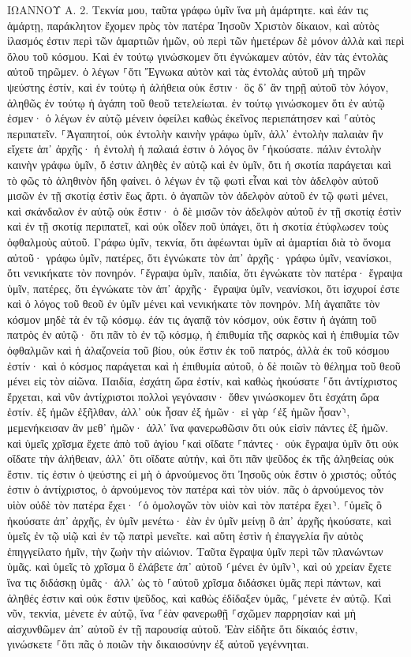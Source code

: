 \documentclass[twoside, 9pt]{extreport}
\begin{document}
ΙΩΑΝΝΟΥ Α.
2.
Τεκνία μου, ταῦτα γράφω ὑμῖν ἵνα μὴ ἁμάρτητε. καὶ ἐάν τις ἁμάρτῃ, παράκλητον ἔχομεν πρὸς τὸν πατέρα Ἰησοῦν Χριστὸν δίκαιον, 
καὶ αὐτὸς ἱλασμός ἐστιν περὶ τῶν ἁμαρτιῶν ἡμῶν, οὐ περὶ τῶν ἡμετέρων δὲ μόνον ἀλλὰ καὶ περὶ ὅλου τοῦ κόσμου. 
Καὶ ἐν τούτῳ γινώσκομεν ὅτι ἐγνώκαμεν αὐτόν, ἐὰν τὰς ἐντολὰς αὐτοῦ τηρῶμεν. 
ὁ λέγων ⸀ὅτι Ἔγνωκα αὐτὸν καὶ τὰς ἐντολὰς αὐτοῦ μὴ τηρῶν ψεύστης ἐστίν, καὶ ἐν τούτῳ ἡ ἀλήθεια οὐκ ἔστιν· 
ὃς δ᾽ ἂν τηρῇ αὐτοῦ τὸν λόγον, ἀληθῶς ἐν τούτῳ ἡ ἀγάπη τοῦ θεοῦ τετελείωται. ἐν τούτῳ γινώσκομεν ὅτι ἐν αὐτῷ ἐσμεν· 
ὁ λέγων ἐν αὐτῷ μένειν ὀφείλει καθὼς ἐκεῖνος περιεπάτησεν καὶ ⸀αὐτὸς περιπατεῖν. 
⸀Ἀγαπητοί, οὐκ ἐντολὴν καινὴν γράφω ὑμῖν, ἀλλ᾽ ἐντολὴν παλαιὰν ἣν εἴχετε ἀπ᾽ ἀρχῆς· ἡ ἐντολὴ ἡ παλαιά ἐστιν ὁ λόγος ὃν ⸀ἠκούσατε. 
πάλιν ἐντολὴν καινὴν γράφω ὑμῖν, ὅ ἐστιν ἀληθὲς ἐν αὐτῷ καὶ ἐν ὑμῖν, ὅτι ἡ σκοτία παράγεται καὶ τὸ φῶς τὸ ἀληθινὸν ἤδη φαίνει. 
ὁ λέγων ἐν τῷ φωτὶ εἶναι καὶ τὸν ἀδελφὸν αὐτοῦ μισῶν ἐν τῇ σκοτίᾳ ἐστὶν ἕως ἄρτι. 
ὁ ἀγαπῶν τὸν ἀδελφὸν αὐτοῦ ἐν τῷ φωτὶ μένει, καὶ σκάνδαλον ἐν αὐτῷ οὐκ ἔστιν· 
ὁ δὲ μισῶν τὸν ἀδελφὸν αὐτοῦ ἐν τῇ σκοτίᾳ ἐστὶν καὶ ἐν τῇ σκοτίᾳ περιπατεῖ, καὶ οὐκ οἶδεν ποῦ ὑπάγει, ὅτι ἡ σκοτία ἐτύφλωσεν τοὺς ὀφθαλμοὺς αὐτοῦ. 
Γράφω ὑμῖν, τεκνία, ὅτι ἀφέωνται ὑμῖν αἱ ἁμαρτίαι διὰ τὸ ὄνομα αὐτοῦ· 
γράφω ὑμῖν, πατέρες, ὅτι ἐγνώκατε τὸν ἀπ᾽ ἀρχῆς· γράφω ὑμῖν, νεανίσκοι, ὅτι νενικήκατε τὸν πονηρόν. 
⸀ἔγραψα ὑμῖν, παιδία, ὅτι ἐγνώκατε τὸν πατέρα· ἔγραψα ὑμῖν, πατέρες, ὅτι ἐγνώκατε τὸν ἀπ᾽ ἀρχῆς· ἔγραψα ὑμῖν, νεανίσκοι, ὅτι ἰσχυροί ἐστε καὶ ὁ λόγος τοῦ θεοῦ ἐν ὑμῖν μένει καὶ νενικήκατε τὸν πονηρόν. 
Μὴ ἀγαπᾶτε τὸν κόσμον μηδὲ τὰ ἐν τῷ κόσμῳ. ἐάν τις ἀγαπᾷ τὸν κόσμον, οὐκ ἔστιν ἡ ἀγάπη τοῦ πατρὸς ἐν αὐτῷ· 
ὅτι πᾶν τὸ ἐν τῷ κόσμῳ, ἡ ἐπιθυμία τῆς σαρκὸς καὶ ἡ ἐπιθυμία τῶν ὀφθαλμῶν καὶ ἡ ἀλαζονεία τοῦ βίου, οὐκ ἔστιν ἐκ τοῦ πατρός, ἀλλὰ ἐκ τοῦ κόσμου ἐστίν· 
καὶ ὁ κόσμος παράγεται καὶ ἡ ἐπιθυμία αὐτοῦ, ὁ δὲ ποιῶν τὸ θέλημα τοῦ θεοῦ μένει εἰς τὸν αἰῶνα. 
Παιδία, ἐσχάτη ὥρα ἐστίν, καὶ καθὼς ἠκούσατε ⸀ὅτι ἀντίχριστος ἔρχεται, καὶ νῦν ἀντίχριστοι πολλοὶ γεγόνασιν· ὅθεν γινώσκομεν ὅτι ἐσχάτη ὥρα ἐστίν. 
ἐξ ἡμῶν ἐξῆλθαν, ἀλλ᾽ οὐκ ἦσαν ἐξ ἡμῶν· εἰ γὰρ ⸂ἐξ ἡμῶν ἦσαν⸃, μεμενήκεισαν ἂν μεθ᾽ ἡμῶν· ἀλλ᾽ ἵνα φανερωθῶσιν ὅτι οὐκ εἰσὶν πάντες ἐξ ἡμῶν. 
καὶ ὑμεῖς χρῖσμα ἔχετε ἀπὸ τοῦ ἁγίου ⸀καὶ οἴδατε ⸀πάντες· 
οὐκ ἔγραψα ὑμῖν ὅτι οὐκ οἴδατε τὴν ἀλήθειαν, ἀλλ᾽ ὅτι οἴδατε αὐτήν, καὶ ὅτι πᾶν ψεῦδος ἐκ τῆς ἀληθείας οὐκ ἔστιν. 
τίς ἐστιν ὁ ψεύστης εἰ μὴ ὁ ἀρνούμενος ὅτι Ἰησοῦς οὐκ ἔστιν ὁ χριστός; οὗτός ἐστιν ὁ ἀντίχριστος, ὁ ἀρνούμενος τὸν πατέρα καὶ τὸν υἱόν. 
πᾶς ὁ ἀρνούμενος τὸν υἱὸν οὐδὲ τὸν πατέρα ἔχει· ⸂ὁ ὁμολογῶν τὸν υἱὸν καὶ τὸν πατέρα ἔχει⸃. 
⸀ὑμεῖς ὃ ἠκούσατε ἀπ᾽ ἀρχῆς, ἐν ὑμῖν μενέτω· ἐὰν ἐν ὑμῖν μείνῃ ὃ ἀπ᾽ ἀρχῆς ἠκούσατε, καὶ ὑμεῖς ἐν τῷ υἱῷ καὶ ἐν τῷ πατρὶ μενεῖτε. 
καὶ αὕτη ἐστὶν ἡ ἐπαγγελία ἣν αὐτὸς ἐπηγγείλατο ἡμῖν, τὴν ζωὴν τὴν αἰώνιον. 
Ταῦτα ἔγραψα ὑμῖν περὶ τῶν πλανώντων ὑμᾶς. 
καὶ ὑμεῖς τὸ χρῖσμα ὃ ἐλάβετε ἀπ᾽ αὐτοῦ ⸂μένει ἐν ὑμῖν⸃, καὶ οὐ χρείαν ἔχετε ἵνα τις διδάσκῃ ὑμᾶς· ἀλλ᾽ ὡς τὸ ⸀αὐτοῦ χρῖσμα διδάσκει ὑμᾶς περὶ πάντων, καὶ ἀληθές ἐστιν καὶ οὐκ ἔστιν ψεῦδος, καὶ καθὼς ἐδίδαξεν ὑμᾶς, ⸀μένετε ἐν αὐτῷ. 
Καὶ νῦν, τεκνία, μένετε ἐν αὐτῷ, ἵνα ⸀ἐὰν φανερωθῇ ⸀σχῶμεν παρρησίαν καὶ μὴ αἰσχυνθῶμεν ἀπ᾽ αὐτοῦ ἐν τῇ παρουσίᾳ αὐτοῦ. 
Ἐὰν εἰδῆτε ὅτι δίκαιός ἐστιν, γινώσκετε ⸀ὅτι πᾶς ὁ ποιῶν τὴν δικαιοσύνην ἐξ αὐτοῦ γεγέννηται. 
\end{document}
